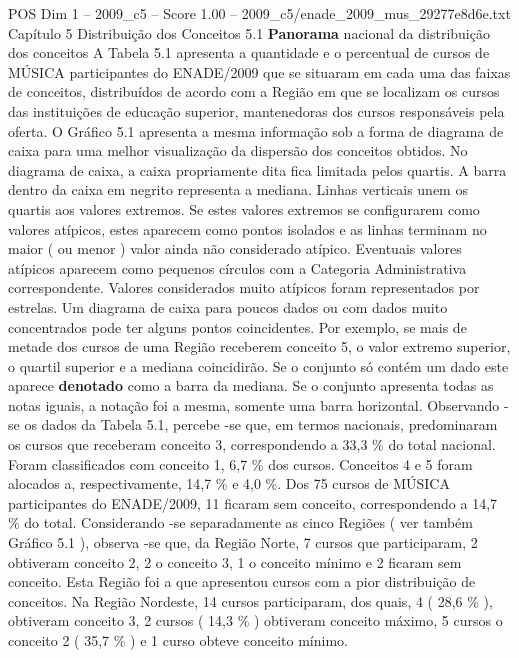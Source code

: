 \begin{textsample}{POS Dim 1 – 2009\_c5 – Score 1.00 – 2009\_c5/enade\_2009\_mus\_29277e8d6e.txt}  \label{ex:f1_pos_144}
Capítulo 5 Distribuição dos Conceitos 5.1 \textbf{Panorama} nacional da distribuição dos conceitos A Tabela 5.1 apresenta a quantidade e o percentual de cursos de MÚSICA participantes do ENADE/2009 que se situaram em cada uma das faixas de conceitos, distribuídos de acordo com a Região em que se localizam os cursos das instituições de educação superior, mantenedoras dos cursos responsáveis pela oferta.
O Gráfico 5.1 apresenta a mesma informação sob a forma de diagrama de caixa para uma melhor visualização da dispersão dos conceitos obtidos.
No diagrama de caixa, a caixa propriamente dita fica limitada pelos quartis.
A barra dentro da caixa em negrito representa a mediana.
Linhas verticais unem os quartis aos valores extremos.
Se estes valores extremos se configurarem como valores atípicos, estes aparecem como pontos isolados e as linhas terminam no maior ( ou menor ) valor ainda não considerado atípico.
Eventuais valores atípicos aparecem como pequenos círculos com a Categoria Administrativa correspondente.
Valores considerados muito atípicos foram representados por estrelas.
Um diagrama de caixa para poucos dados ou com dados muito concentrados pode ter alguns pontos coincidentes.
Por exemplo, se mais de metade dos cursos de uma Região receberem conceito 5, o valor extremo superior, o quartil superior e a mediana coincidirão.
Se o conjunto só contém um dado este aparece \textbf{denotado} como a barra da mediana.
Se o conjunto apresenta todas as notas iguais, a notação foi a mesma, somente uma barra horizontal.
Observando -se os dados da Tabela 5.1, percebe -se que, em termos nacionais, predominaram os cursos que receberam conceito 3, correspondendo a 33,3 \% do total nacional.
Foram classificados com conceito 1, 6,7 \% dos cursos.
Conceitos 4 e 5 foram alocados a, respectivamente, 14,7 \% e 4,0 \%.
Dos 75 cursos de MÚSICA participantes do ENADE/2009, 11 ficaram sem conceito, correspondendo a 14,7 \% do total.
Considerando -se separadamente as cinco Regiões ( ver também Gráfico 5.1 ), observa -se que, da Região Norte, 7 cursos que participaram, 2 obtiveram conceito 2, 2 o conceito 3, 1 o conceito mínimo e 2 ficaram sem conceito.
Esta Região foi a que apresentou cursos com a pior distribuição de conceitos.
Na Região Nordeste, 14 cursos participaram, dos quais, 4 ( 28,6 \% ), obtiveram conceito 3, 2 cursos ( 14,3 \% ) obtiveram conceito máximo, 5 cursos o conceito 2 ( 35,7 \% ) e 1 curso obteve conceito mínimo.

\end{textsample}
